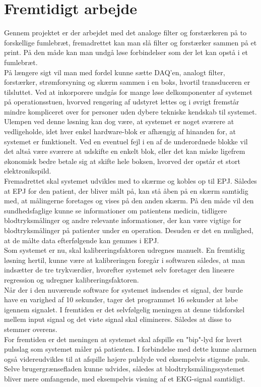 \section{Fremtidigt arbejde} \label{fremtid}
Gennem projektet er der arbejdet med det analoge filter og forstærkeren på to forskellige fumlebræt, fremadrettet kan man slå filter og forstærker sammen på et print. På den måde kan man undgå løse forbindelser som der let kan opstå i et fumlebræt.\\[2ex]
På længere sigt vil man med fordel kunne sætte DAQ’en, analogt filter, forstærker, strømforsyning og skærm sammen i en boks, hvortil transduceren er tilsluttet. Ved at inkorporere undgås for mange løse delkomponenter af systemet på operationsstuen, hvorved rengøring af udstyret lettes og i øvrigt fremstår mindre kompliceret over for personer uden dybere tekniske kendskab til systemet. Ulempen ved denne løsning kan dog være, at systemet er noget sværere at vedligeholde, idet hver enkel hardware-blok er afhængig af hinanden for, at systemet er funktionelt. Ved en eventuel fejl i en af de underordnede blokke vil det altså være sværere at udskifte en enkelt blok, eller det kan måske ligefrem økonomisk bedre betale sig at skifte hele boksen, hvorved der opstår et stort elektronikspild.\\[2ex]
Fremadrettet skal systemet udvikles med to skærme og kobles op til EPJ. Således at EPJ for den patient, der bliver målt på, kan stå åben på en skærm samtidig med, at målingerne foretages og vises på den anden skærm. På den måde vil den sundhedsfaglige kunne se informationer om patientens medicin, tidligere blodtryksmålinger og andre relevante informationer, der kan være vigtige for blodtryksmålinger på patienter under en operation. Desuden er det en mulighed, at de målte data efterfølgende kan gemmes i EPJ.\\[1ex]
Som systemet er nu, skal kalibreringsfaktoren udregnes manuelt. En fremtidig løsning hertil, kunne være at kalibreringen foregår i softwaren således, at man indsætter de tre trykværdier, hvorefter systemet selv foretager den lineære regression og udregner kalibreringsfaktoren. \\ [1ex]
Når der i den nuværende software for systemet indsendes et signal, der burde have en varighed af 10 sekunder, tager det programmet 16 sekunder at løbe igennem signalet. I fremtiden er det selvfølgelig meningen at denne tidsforskel mellem input signal og det viste signal skal elimineres. Således at disse to stemmer overens.\\[1ex]
For fremtiden er det meningen at systemet skal afspille en "bip"\--lyd for hvert pulsslag som systemet måler på patienten. I forbindelse med dette kunne alarmen også videreudvikles til at afspille højere pulslyde ved eksempelvis stigende puls. \\[1ex]
Selve brugergrænsefladen kunne udvides, således at blodtryksmålingssystemet bliver mere omfangende, med eksempelvis visning af et EKG-signal samtidigt.\\

